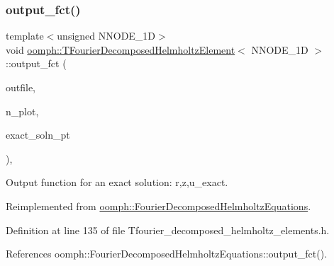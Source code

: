 \subsubsection{\texorpdfstring{output\+\_\+fct()}{output\_fct()}\hspace{0.1cm}{\footnotesize\ttfamily [1/2]}}
{\footnotesize\ttfamily template$<$unsigned N\+N\+O\+D\+E\+\_\+1D$>$ \\
void \hyperlink{classoomph_1_1TFourierDecomposedHelmholtzElement}{oomph\+::\+T\+Fourier\+Decomposed\+Helmholtz\+Element}$<$ N\+N\+O\+D\+E\+\_\+1D $>$\+::output\+\_\+fct (\begin{DoxyParamCaption}\item[{std\+::ostream \&}]{outfile,  }\item[{const unsigned \&}]{n\+\_\+plot,  }\item[{\hyperlink{classoomph_1_1FiniteElement_a690fd33af26cc3e84f39bba6d5a85202}{Finite\+Element\+::\+Steady\+Exact\+Solution\+Fct\+Pt}}]{exact\+\_\+soln\+\_\+pt }\end{DoxyParamCaption})\hspace{0.3cm}{\ttfamily [inline]}, {\ttfamily [virtual]}}



Output function for an exact solution\+: r,z,u\+\_\+exact. 



Reimplemented from \hyperlink{classoomph_1_1FourierDecomposedHelmholtzEquations_a9024cd81a80a4709b127560b6f15cd43}{oomph\+::\+Fourier\+Decomposed\+Helmholtz\+Equations}.



Definition at line 135 of file Tfourier\+\_\+decomposed\+\_\+helmholtz\+\_\+elements.\+h.



References oomph\+::\+Fourier\+Decomposed\+Helmholtz\+Equations\+::output\+\_\+fct().

\mbox{\label{classoomph_1_1TFourierDecomposedHelmholtzElement_a0d7669c1d9028c760c2c77b0be927f97}} 

